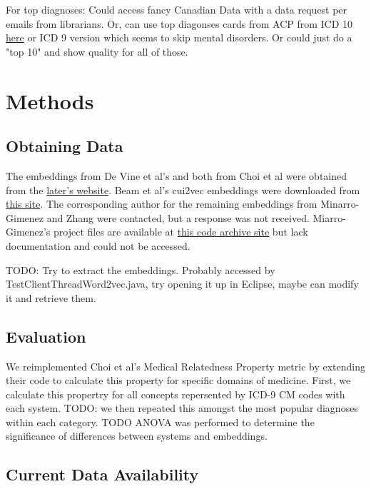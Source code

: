 \documentclass[10pt]{article}
\begin{document}
For top diagnoses: Could access fancy Canadian Data with a data request per emails from librarians. Or, can use top diagonses cards from ACP from ICD 10 \href{https://www.acponline.org/system/files/documents/running_practice/payment_coding/coding/icd10_coding_card.pdf}{here} or ICD 9 version which seems to skip mental disorders. Or could just do a "top 10" and show quality for all of those.


\section{Methods}

\subsection{Obtaining Data}

The embeddings from De Vine et al's  and both from Choi et al were obtained from the \href{https://github.com/clinicalml/embeddings}{later's website}. Beam et al's cui2vec embeddings were downloaded from \href{https://figshare.com/s/00d69861786cd0156d81}{this site}. The corresponding author for the remaining embeddings from Minarro-Gimenez and Zhang were contacted, but a response was not received. Miarro-Gimenez's project files are available at \href{https://code.google.com/archive/p/biomedical-text-exploring-tools/}{this code archive site} but lack documentation and could not be accessed. 

TODO: Try to extract the embeddings. Probably accessed by TestClientThreadWord2vec.java, try opening it up in Eclipse, maybe can modify it and retrieve them. 

\subsection{Evaluation}

We reimplemented Choi et al's Medical Relatedness Property metric by extending their code to calculate this property for specific domains of medicine. First, we calculate this propertry for all concepts repersented by ICD-9 CM codes with each system. TODO: we then repeated this amongst the most popular diagnoses within each category. TODO ANOVA was performed to determine the significance of differences between systems and embeddings. 


 

\subsection{Current Data Availability}
\end{document}
